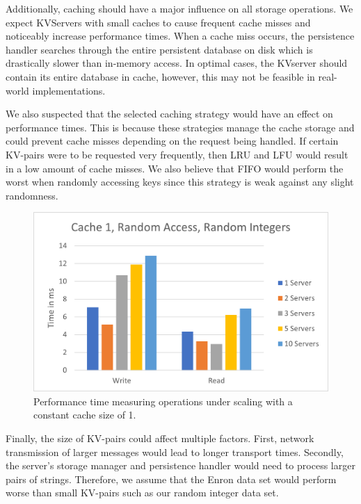 \documentclass[sigconf]{acmart}
\begin{document}
Additionally, caching should have a major influence on all storage operations. We expect KVServers with small caches to cause frequent cache misses and noticeably increase performance times. When a cache miss occurs, the persistence handler searches through the entire persistent database on disk which is drastically slower than in-memory access. In optimal cases, the KVserver should contain its entire database in cache, however, this may not be feasible in real-world implementations. 

We also suspected that the selected caching strategy would have an effect on performance times. This is because these strategies manage the cache storage and could prevent cache misses depending on the request being handled. If certain KV-pairs were to be requested very frequently, then LRU and LFU would result in a low amount of cache misses. We also believe that FIFO would perform the worst when randomly accessing keys since this strategy is weak against any slight randomness.

\begin{center}
  \begin{figure}[htbp]
    \centerline{\includegraphics[scale=0.65]{attachments/Cache 1.png}}
    \caption{Performance time measuring operations under scaling with a constant cache size of 1.}
    \label{Cache 1}
  \end{figure}
\end{center}

Finally, the size of KV-pairs could affect multiple factors. First, network transmission of larger messages would lead to longer transport times. Secondly, the server’s storage manager and persistence handler would need to process larger pairs of strings. Therefore, we assume that the Enron data set would perform worse than small KV-pairs such as our random integer data set.
\end{document}
